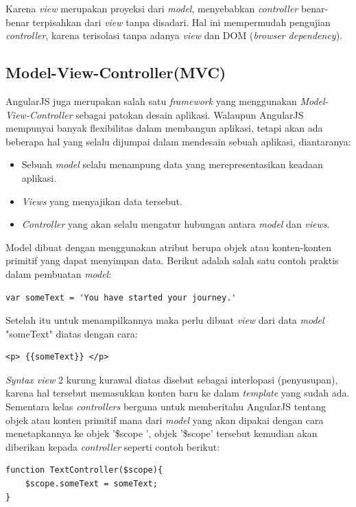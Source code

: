	Karena \textit{view} merupakan proyeksi dari \textit{model}, menyebabkan \textit{controller} benar-benar terpisahkan dari \textit{view} tanpa disadari. Hal ini mempermudah pengujian \textit{controller}, karena terisolasi tanpa adanya \textit{view} dan DOM (\textit{browser dependency}).
	
\subsection{Model-View-Controller(MVC)}
\label{sub: mvcAngular}

	AngularJS\cite{green2013angularjs} juga merupakan salah satu \textit{framework} yang menggunakan  \textit{Model-View-Controller} sebagai patokan desain aplikasi. Walaupun AngularJS mempunyai banyak flexibilitas dalam membangun aplikasi, tetapi akan ada beberapa hal yang selalu dijumpai dalam mendesain sebuah aplikasi, diantaranya:
	\begin{itemize}
		\item Sebuah \textit{model} selalu menampung data yang merepresentasikan keadaan aplikasi.
		\item \textit{Views} yang menyajikan data tersebut.
		\item \textit{Controller} yang akan selalu mengatur hubungan antara \textit{model} dan \textit{views}.
	\end{itemize}
	
	Model dibuat dengan menggunakan atribut berupa objek atau konten-konten primitif yang dapat menyimpan data. Berikut adalah salah satu contoh praktis dalam pembuatan \textit{model}:
\begin{lstlisting}
var someText = 'You have started your journey.'
\end{lstlisting}
	Setelah itu untuk menampilkannya maka perlu dibuat \textit{view} dari data \textit{model} "someText" diatas dengan cara:
\begin{lstlisting}
<p> {{someText}} </p>
\end{lstlisting}
	\textit{Syntax view} 2 kurung kurawal diatas disebut sebagai interlopasi (penyusupan), karena hal tersebut memasukkan konten baru ke dalam \textit{template} yang sudah ada.\\
	Sementara kelas \textit{controllers} berguna untuk memberitahu AngularJS tentang objek atau konten primitif mana dari \textit{model} yang akan dipakai dengan cara menetapkannya ke objek '\$scope ', objek '\$scope' tersebut kemudian akan diberikan kepada \textit{controller} seperti contoh berikut:
\begin{lstlisting}
function TextController($scope){
	$scope.someText = someText;
}
\end{lstlisting}
	
